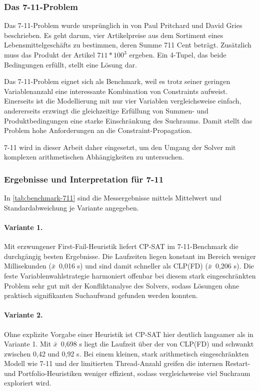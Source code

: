 \documentclass[12pt,a4paper]{article}
\begin{document}
\subsubsection{Das 7-11-Problem}
Das 7-11-Problem wurde ursprünglich in \cite{seven_eleven} von Paul Pritchard und David Gries beschrieben.
Es geht darum, vier Artikelpreise aus dem Sortiment eines Lebensmittelgeschäfts zu bestimmen, deren Summe 711 Cent beträgt.
Zusätzlich muss das Produkt der Artikel $711 * 100^3$ ergeben.
Ein 4-Tupel, das beide Bedingungen erfüllt, stellt eine Lösung dar. 

Das 7-11-Problem eignet sich als Benchmark, weil es trotz seiner geringen Variablenanzahl eine interessante Kombination von Constraints aufweist.
Einerseits ist die Modellierung mit nur vier Variablen vergleichsweise einfach, andererseits erzwingt die gleichzeitige Erfüllung von Summen- und Produktbedingungen eine starke Einschränkung des Suchraums.
Damit stellt das Problem hohe Anforderungen an die Constraint-Propagation.

7-11 wird in dieser Arbeit daher eingesetzt, um den Umgang der Solver mit komplexen arithmetischen Abhängigkeiten zu untersuchen.
\subsubsection{Ergebnisse und Interpretation für 7-11}
In \autoref{tab:benchmark-711} sind die Messergebnisse mittels Mittelwert und Standardabweichung je Variante angegeben.
\paragraph{Variante 1.}
Mit erzwungener First-Fail-Heuristik liefert CP-SAT im 7-11-Benchmark die durchgängig besten Ergebnisse.
Die Laufzeiten liegen konstant im Bereich weniger Millisekunden ($\bar{x}$~0,016 s) und sind damit schneller als CLP(FD) ($\bar{x}$~0,206 s).
Die feste Variablenwahlstrategie harmoniert offenbar bei diesem stark eingeschränkten Problem sehr gut mit der Konfliktanalyse des Solvers, sodass Lösungen ohne praktisch signifikanten Suchaufwand gefunden werden konnten.

\paragraph{Variante 2.}
Ohne explizite Vorgabe einer Heuristik ist CP-SAT hier deutlich langsamer als in Variante 1.
Mit $\bar{x}$~0,698 s liegt die Laufzeit über der von CLP(FD) und schwankt zwischen 0,42 und 0,92 s.
Bei einem kleinen, stark arithmetisch eingeschränkten Modell wie 7-11 und der limitierten Thread-Anzahl greifen die internen Restart- und Portfolio-Heuristiken weniger effizient, sodass vergleichsweise viel Suchraum exploriert wird.
\end{document}
